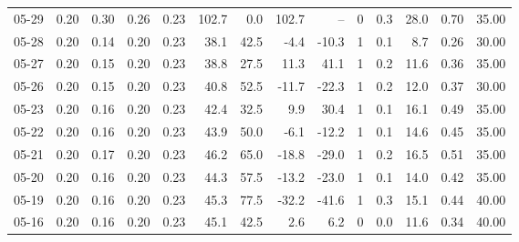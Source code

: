 \begin{threeparttable}
{\begin{tabular}{lrrrrrrrrrrrrr}
  05-29 &          0.20 &          0.30 &          0.26 &        0.23 &               102.7 &                 0.0 &      102.7 &           -- &              0 &                 0.3 &             28.0 &            0.70 &                  35.00 \\
  05-28 &          0.20 &          0.14 &          0.20 &        0.23 &                38.1 &                42.5 &       -4.4 &        -10.3 &              1 &                 0.1 &              8.7 &            0.26 &                  30.00 \\
  05-27 &          0.20 &          0.15 &          0.20 &        0.23 &                38.8 &                27.5 &       11.3 &         41.1 &              1 &                 0.2 &             11.6 &            0.36 &                  35.00 \\
  05-26 &          0.20 &          0.15 &          0.20 &        0.23 &                40.8 &                52.5 &      -11.7 &        -22.3 &              1 &                 0.2 &             12.0 &            0.37 &                  30.00 \\
  05-23 &          0.20 &          0.16 &          0.20 &        0.23 &                42.4 &                32.5 &        9.9 &         30.4 &              1 &                 0.1 &             16.1 &            0.49 &                  35.00 \\
  05-22 &          0.20 &          0.16 &          0.20 &        0.23 &                43.9 &                50.0 &       -6.1 &        -12.2 &              1 &                 0.1 &             14.6 &            0.45 &                  35.00 \\
  05-21 &          0.20 &          0.17 &          0.20 &        0.23 &                46.2 &                65.0 &      -18.8 &        -29.0 &              1 &                 0.2 &             16.5 &            0.51 &                  35.00 \\
  05-20 &          0.20 &          0.16 &          0.20 &        0.23 &                44.3 &                57.5 &      -13.2 &        -23.0 &              1 &                 0.1 &             14.0 &            0.42 &                  35.00 \\
  05-19 &          0.20 &          0.16 &          0.20 &        0.23 &                45.3 &                77.5 &      -32.2 &        -41.6 &              1 &                 0.3 &             15.1 &            0.44 &                  40.00 \\
  05-16 &          0.20 &          0.16 &          0.20 &        0.23 &                45.1 &                42.5 &        2.6 &          6.2 &              0 &                 0.0 &             11.6 &            0.34 &                  40.00 \\

\end{tabular}}
\end{threeparttable}
